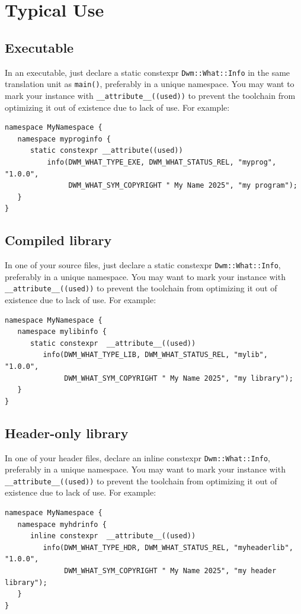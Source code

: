 \chapter{Typical Use}
\section{Executable}
In an executable, just declare a static constexpr
\texttt{Dwm::What::Info} in the same translation unit as
\texttt{main()}, preferably in a unique namespace.  You may want to
mark your instance with \texttt{\_\_attribute\_\_((used))} to prevent
the toolchain from optimizing it out of existence due to lack of use.
For example:

\begin{verbatim}
namespace MyNamespace {
   namespace myproginfo {
      static constexpr __attribute((used))
          info(DWM_WHAT_TYPE_EXE, DWM_WHAT_STATUS_REL, "myprog", "1.0.0",
               DWM_WHAT_SYM_COPYRIGHT " My Name 2025", "my program");
   }
}
\end{verbatim}

\section{Compiled library}
In one of your source files, just declare a static constexpr
\texttt{Dwm::What::Info}, preferably in a unique namespace.  You may
want to mark your instance with \texttt{\_\_attribute\_\_((used))}
to prevent the toolchain from optimizing it out of existence due to
lack of use.  For example:

\begin{verbatim}
namespace MyNamespace {
   namespace mylibinfo {
      static constexpr  __attribute__((used))
         info(DWM_WHAT_TYPE_LIB, DWM_WHAT_STATUS_REL, "mylib", "1.0.0",
              DWM_WHAT_SYM_COPYRIGHT " My Name 2025", "my library");
   }
}
\end{verbatim}

\section{Header-only library}
In one of your header files, declare an inline constexpr
\texttt{Dwm::What::Info}, preferably in a unique namespace.  You may
want to mark your instance with \texttt{\_\_attribute\_\_((used))}
to prevent the toolchain from optimizing it out of existence due to
lack of use.  For example:

\begin{verbatim}
namespace MyNamespace {
   namespace myhdrinfo {
      inline constexpr  __attribute__((used))
         info(DWM_WHAT_TYPE_HDR, DWM_WHAT_STATUS_REL, "myheaderlib", "1.0.0",
              DWM_WHAT_SYM_COPYRIGHT " My Name 2025", "my header library");
   }
}
\end{verbatim}

